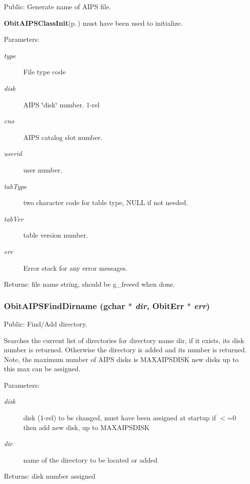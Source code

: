 Public: Generate name of AIPS file. 

{\bf Obit\-AIPSClass\-Init}{\rm (p.\,\pageref{ObitAIPS_8c_a5})} must have been used to initialize. \begin{Desc}
\item[Parameters:]
\begin{description}
\item[{\em type}]File type code \item[{\em disk}]AIPS \char`\"{}disk\char`\"{} number. 1-rel \item[{\em cno}]AIPS catalog slot number. \item[{\em userid}]user number. \item[{\em tab\-Type}]two character code for table type, NULL if not needed. \item[{\em tab\-Ver}]table version number. \item[{\em err}]Error stack for any error messages. \end{description}
\end{Desc}
\begin{Desc}
\item[Returns:]file name string, should be g\_\-freeed when done. \end{Desc}
\subsubsection{ Obit\-AIPSFind\-Dirname (gchar $\ast$ {\em dir}, {\bf Obit\-Err} $\ast$ {\em err})}\label{ObitAIPS_8h_a15}


Public: Find/Add directory. 

Searches the current list of directories for directory name dir, if it exists, its disk number is returned. Otherwise the directory is added and its number is returned. Note, the maximum number of AIPS disks is MAXAIPSDISK new disks up to this max can be assigned. \begin{Desc}
\item[Parameters:]
\begin{description}
\item[{\em disk}]disk (1-rel) to be changed, must have been assigned at startup if $<$=0 then add new disk, up to MAXAIPSDISK \item[{\em dir}]name of the directory to be located or added \end{description}
\end{Desc}
\begin{Desc}
\item[Returns:]disk number assigned \end{Desc}
